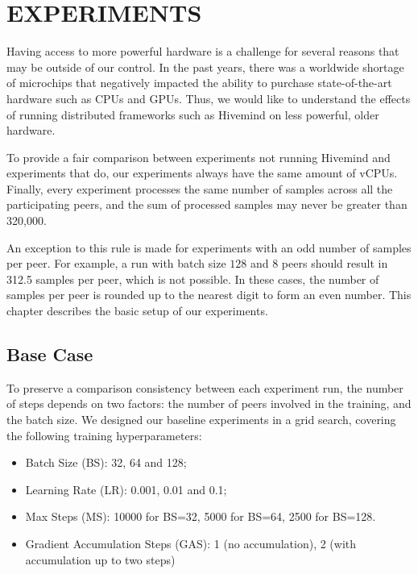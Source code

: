 \chapter{EXPERIMENTS}\label{chapter:experiments}

Having access to more powerful hardware is a challenge for several reasons that may be outside of our control.
In the past years, there was a worldwide shortage of microchips that negatively impacted the ability to purchase state-of-the-art hardware such as CPUs and GPUs.
Thus, we would like to understand the effects of running distributed frameworks such as Hivemind on less powerful, older hardware.

To provide a fair comparison between experiments not running Hivemind and experiments that do, our experiments always have the same amount of vCPUs.
Finally, every experiment processes the same number of samples across all the participating peers, and the sum of processed samples may never be greater than 320,000.

An exception to this rule is made for experiments with an odd number of samples per peer.
For example, a run with batch size $128$ and 8 peers should result in 312.5 samples per peer, which is not possible.
In these cases, the number of samples per peer is rounded up to the nearest digit to form an even number.
This chapter describes the basic setup of our experiments.

\section{Base Case}

To preserve a comparison consistency between each experiment run, the number of steps depends on two factors: the number of peers involved in the training, and the batch size.
We designed our baseline experiments in a grid search, covering the following training hyperparameters:
\begin{itemize}
    \item Batch Size (BS): 32, 64 and 128;
    \item Learning Rate (LR): 0.001, 0.01 and 0.1;
    \item Max Steps (MS): 10000 for BS=32, 5000 for BS=64, 2500 for BS=128.
    \item Gradient Accumulation Steps (GAS): 1 (no accumulation), 2 (with accumulation up to two steps)
\end{itemize}

